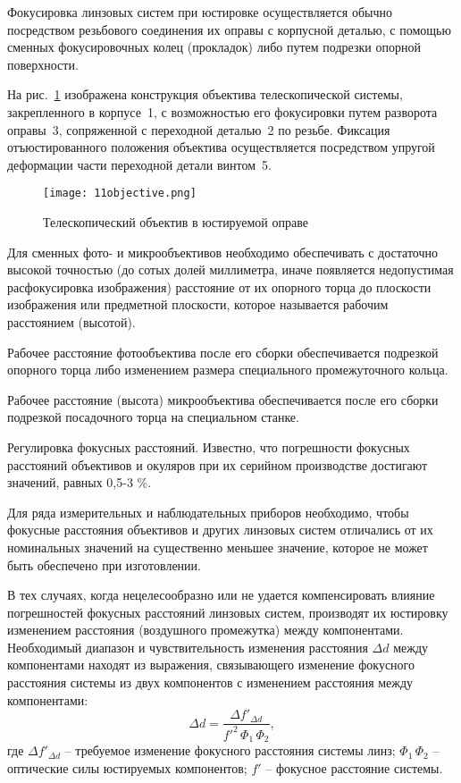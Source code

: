 Фокусировка линзовых систем при юстировке осуществляется обычно посредством резьбового соединения их оправы с корпусной деталью, с помощью сменных фокусировочных колец (прокладок) либо путем подрезки опорной поверхности.

На рис.~\ref{pic:11objective} изображена конструкция объектива телескопической системы, закрепленного в корпусе~1, с возможностью его фокусировки путем разворота оправы~3, сопряженной с переходной деталью~2 по резьбе. Фиксация отъюстированного положения объектива осуществляется посредством упругой деформации части переходной детали винтом~5.

\begin{figure}[h!]
	\begin{center}
		\caption{ Телескопический объектив в юстируемой оправе }
		\texttt{[image: 11objective.png]}
		\label{pic:11objective}
	\end{center}
\end{figure}

Для сменных фото- и микрообъективов необходимо обеспечивать с достаточно высокой точностью (до сотых долей миллиметра, иначе появляется недопустимая расфокусировка изображения) расстояние от их опорного торца до плоскости изображения или предметной плоскости, которое называется рабочим расстоянием (высотой).

Рабочее расстояние фотообъектива после его сборки обеспечивается подрезкой опорного торца либо изменением размера специального промежуточного кольца.

Рабочее расстояние (высота) микрообъектива обеспечивается после его сборки подрезкой посадочного торца на специальном станке.

Регулировка фокусных расстояний. Известно, что погрешности фокусных расстояний объективов и окуляров при их серийном производстве достигают значений, равных 0,5-3 \%.

Для ряда измерительных и наблюдательных приборов необходимо, чтобы фокусные расстояния объективов и других линзовых систем отличались от их номинальных значений на существенно меньшее значение, которое не может быть обеспечено при изготовлении.

В тех случаях, когда нецелесообразно или не удается компенсировать влияние погрешностей фокусных расстояний линзовых систем, производят их юстировку изменением расстояния (воздушного промежутка) между компонентами. Необходимый диапазон и чувствительность изменения расстояния $ \Delta d $ между компонентами находят из выражения, связывающего изменение фокусного расстояния системы из двух компонентов с изменением расстояния между компонентами:
\[ \Delta d = \dfrac{\Delta f'_{\Delta d}}{f'^2 \, \Phi_1 \, \Phi_2}, \]
где $ \Delta f'_{\Delta d} $ -- требуемое изменение фокусного расстояния системы линз; $ \Phi_1 \, \Phi_2 $ -- оптические силы юстируемых компонентов; $ f' $ -- фокусное расстояние системы.

